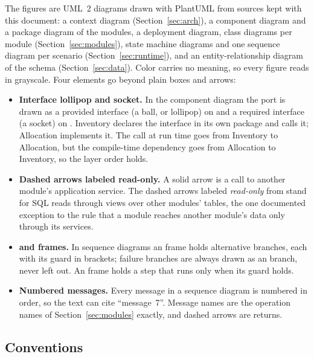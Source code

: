 The figures are UML~2 diagrams drawn with PlantUML from sources kept with this document: a context diagram (Section~\ref{sec:arch}), a component diagram and a package diagram of the modules, a deployment diagram, class diagrams per module (Section~\ref{sec:modules}), state machine diagrams and one sequence diagram per scenario (Section~\ref{sec:runtime}), and an entity-relationship diagram of the schema (Section~\ref{sec:data}). Color carries no meaning, so every figure reads in grayscale. Four elements go beyond plain boxes and arrows:

\begin{itemize}
  \item \textbf{Interface lollipop and socket.} In the component diagram the port  is drawn as a provided interface (a ball, or lollipop) on  and a required interface (a socket) on . Inventory declares the interface in its own package and calls it; Allocation implements it. The call at run time goes from Inventory to Allocation, but the compile-time dependency goes from Allocation to Inventory, so the layer order holds.
  \item \textbf{Dashed arrows labeled read-only.} A solid arrow is a call to another module's application service. The dashed arrows labeled \emph{read-only} from  stand for SQL reads through views over other modules' tables, the one documented exception to the rule that a module reaches another module's data only through its services.
  \item \textbf{ and  frames.} In sequence diagrams an  frame holds alternative branches, each with its guard in brackets; failure branches are always drawn as an  branch, never left out. An  frame holds a step that runs only when its guard holds.
  \item \textbf{Numbered messages.} Every message in a sequence diagram is numbered in order, so the text can cite ``message~7''. Message names are the operation names of Section~\ref{sec:modules} exactly, and dashed arrows are returns.
\end{itemize}

\subsection{Conventions}

